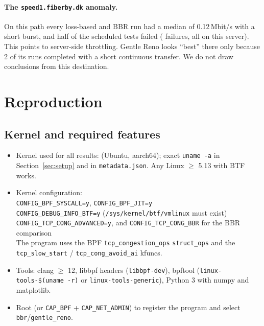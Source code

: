 \documentclass[11pt]{article}
\newcommand{\alg}[1]{\texttt{#1}}
\newcommand{\GR}{Gentle Reno}
\begin{document}
\paragraph{The \texttt{speed1.fiberby.dk} anomaly.}
On this path every loss-based and BBR run had a median of 0.12\,Mbit/s with a short burst, and half
of the scheduled tests failed ( failures, all on this server). This points to
server-side throttling. \GR{} looks ``best'' there only because 2 of its runs completed with a short
continuous transfer. We do not draw conclusions from this destination.

\section{Reproduction}
\label{sec:repro}

\subsection{Kernel and required features}
\begin{itemize}
  \item Kernel used for all results: \textbf{\texttt{}} (Ubuntu, aarch64); exact
  \texttt{uname -a} in Section~\ref{sec:setup} and in \texttt{metadata.json}. Any Linux $\ge$ 5.13 with BTF works.
  \item Kernel configuration:\\
  \hspace*{1em}\texttt{CONFIG\_BPF\_SYSCALL=y}, \texttt{CONFIG\_BPF\_JIT=y}\\
  \hspace*{1em}\texttt{CONFIG\_DEBUG\_INFO\_BTF=y} (\texttt{/sys/kernel/btf/vmlinux} must exist)\\
  \hspace*{1em}\texttt{CONFIG\_TCP\_CONG\_ADVANCED=y}, and \texttt{CONFIG\_TCP\_CONG\_BBR} for the BBR comparison\\
  The program uses the BPF \texttt{tcp\_congestion\_ops} \texttt{struct\_ops} and the
  \texttt{tcp\_slow\_start} / \texttt{tcp\_cong\_avoid\_ai} kfuncs.
  \item Tools: clang $\ge$ 12, libbpf headers (\texttt{libbpf-dev}), bpftool
  (\texttt{linux-tools-\$(uname -r)} or \texttt{linux-tools-generic}), Python 3 with numpy and matplotlib.
  \item Root (or \texttt{CAP\_BPF} + \texttt{CAP\_NET\_ADMIN}) to register the program and select
  \alg{bbr}/\alg{gentle\_reno}.
\end{itemize}
\end{document}
